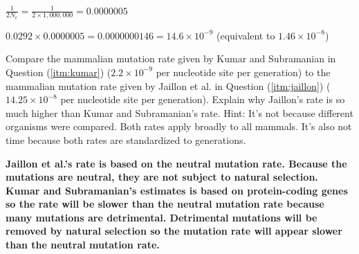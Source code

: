 \documentclass[11pt, addpoints, hidelinks]{exam}
\begin{document}
\begin{questions}
{	$\frac{1}{2N_e} = \frac{1}{2 \times 1,000,000} = 0.0000005$
	
	$0.0292 \times 0.0000005 = 0.0000000146 = 14.6 \times 10^{-9}$ (equivalent to $1.46 \times 10^{-8}$)}
\else
\fi

\question[2]
Compare the mammalian mutation rate given by Kumar and Subramanian in Question (\ref{itm:kumar}) ($2.2 \times 10^{-9}$ per nucleotide site per generation) to the mammalian mutation rate given by Jaillon et al. in Question (\ref{itm:jaillon}) ($14.25 \times 10^{-8}$ per nucleotide site per generation). Explain why Jaillon's rate is so much higher than Kumar and Subramanian's rate. Hint: It's not because different organisms were compared. Both rates apply broadly to all mammals. It's also not time because both rates are standardized to generations.

\ifprintanswers\vspace*{\baselineskip}
{\bfseries Jaillon et al.'s rate is based on the neutral mutation rate. Because the mutations are neutral, they are not subject to natural selection. Kumar and Subramanian's estimates is based on protein-coding genes so the rate will be slower than the neutral mutation rate because many mutations are detrimental. Detrimental mutations will be removed by natural selection so the mutation rate will appear slower than the neutral mutation rate.}
\else
\fi

\end{questions}
\end{document}
